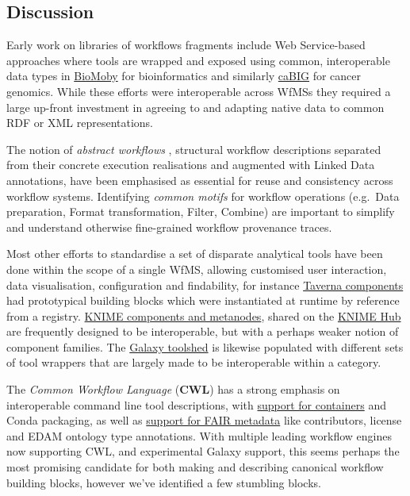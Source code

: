 \subsection{Discussion}\label{discussion-1}

Early work on libraries of workflows fragments include Web Service-based
approaches where tools are wrapped and exposed using common,
interoperable data types in \href{http://biomoby.open-bio.org/}{BioMoby}
\cite{ch6-27} for bioinformatics and similarly
\href{https://en.wikipedia.org/wiki/CaBIG}{caBIG} \cite{ch6-28} for cancer
genomics. While these efforts were interoperable across WfMSs they
required a large up-front investment in agreeing to and adapting native
data to common RDF or XML representations.

The notion of \emph{abstract workflows} \cite{ch6-29}, structural workflow
descriptions separated from their concrete execution realisations and
augmented with Linked Data annotations, have been emphasised as
essential for reuse and consistency across workflow systems. Identifying
\emph{common motifs} for workflow operations \cite{ch6-30} (e.g.~Data
preparation, Format transformation, Filter, Combine) are important to
simplify and understand otherwise fine-grained workflow provenance
traces.

Most other efforts to standardise a set of disparate analytical tools
have been done within the scope of a single WfMS, allowing customised
user interaction, data visualisation, configuration and findability, for
instance
\href{http://www.taverna.org.uk/documentation/taverna-2-x/components/}{Taverna
components} had prototypical building blocks \cite{ch6-31} which were
instantiated at runtime by reference from a registry.
\href{https://docs.knime.com/2020-07/analytics_platform_components_guide/index.html}{KNIME
components and metanodes}, shared on the
\href{https://hub.knime.com/}{KNIME Hub} are frequently designed to be
interoperable, but with a perhaps weaker notion of component families.
The \href{https://toolshed.g2.bx.psu.edu/}{Galaxy toolshed} \cite{ch6-32} is
likewise populated with different sets of tool wrappers that are largely
made to be interoperable within a category.

The \emph{Common Workflow Language} (\textbf{CWL}) \cite{Crusoe 2022} has a strong
emphasis on interoperable command line tool descriptions, with
\href{https://www.commonwl.org/user_guide/07-containers/}{support for
containers} and Conda packaging, as well as
\href{https://www.commonwl.org/user_guide/17-metadata/}{support for FAIR
metadata} like contributors, license and EDAM ontology type annotations.
With multiple leading workflow engines now supporting CWL, and
experimental Galaxy support, this seems perhaps the most promising
candidate for both making and describing canonical workflow building
blocks, however we've identified a few stumbling blocks.

